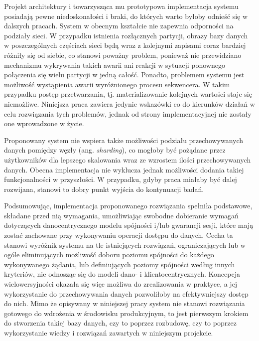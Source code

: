 Projekt architektury i towarzysząca mu prototypowa implementacja systemu posiadają pewne niedoskonałości i braki, do których warto byłoby odnieść się w dalszych pracach. System w obecnym kształcie nie zapewnia odporności na podziały sieci. W przypadku istnienia rozłącznych partycji, obrazy bazy danych w poszczególnych częściach sieci będą wraz z kolejnymi zapisami coraz bardziej różniły się od siebie, co stanowi poważny problem, ponieważ nie przewidziano mechanizmu wykrywania takich awarii ani reakcji w sytuacji ponownego połączenia się wielu partycji w jedną całość. Ponadto, problemem systemu jest możliwość wystąpienia awarii wyróżnionego procesu sekwencera. W takim przypadku postęp przetwarzania, tj. materializowanie kolejnych wartości staje się niemożliwe. Niniejsza praca zawiera jedynie wskazówki co do kierunków działań w celu rozwiązania tych problemów, jednak od strony implementacyjnej nie zostały one wprowadzone w życie.

Proponowany system nie wspiera także możliwości podziału przechowywanych danych pomiędzy węzły (ang. \textit{sharding}), co mogłoby być pożądane przez użytkowników dla lepszego skalowania wraz ze wzrostem ilości przechowywanych danych. Obecna implementacja nie wyklucza jednak możliwości dodania takiej funkcjonalności w przyszłości. W przypadku, gdyby praca miałaby być dalej rozwijana, stanowi to dobry punkt wyjścia do kontynuacji badań.

Podsumowując, implementacja proponowanego rozwiązania spełniła podstawowe, składane przed nią wymagania, umożliwiając swobodne dobieranie wymagań dotyczących danocentrycznego modelu spójności i/lub gwarancji sesji, które mają zostać zachowane przy wykonywaniu operacji dostępu do danych. Cecha ta stanowi wyróżnik systemu na tle istniejących rozwiązań, ograniczających lub w ogóle eliminujących możliwość doboru poziomu spójności do każdego wykonywanego żądania, lub definiujących poziomy spójności według innych kryteriów, nie odnosząc się do modeli dano- i klientocentrycznych. Koncepcja wielowersyjności okazała się więc możliwa do zrealizowania w praktyce, a jej wykorzystanie do przechowywania danych pozwoliłoby na efektywniejszy dostęp do nich. Mimo że opisywany w niniejszej pracy system nie stanowi rozwiązania gotowego do wdrożenia w środowisku produkcyjnym, to jest pierwszym krokiem do stworzenia takiej bazy danych, czy to poprzez rozbudowę, czy to poprzez wykorzystanie wiedzy i rozwiązań zawartych w niniejszym projekcie.